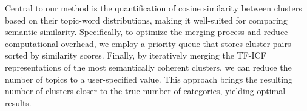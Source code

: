 Central to our method is the quantification of cosine similarity between clusters based on their topic-word distributions, making it well-suited for comparing semantic similarity. Specifically, to optimize the merging process and reduce computational overhead, we employ a priority queue that stores cluster pairs sorted by similarity scores. Finally, by iteratively merging the TF-ICF representations of the most semantically coherent clusters, we can reduce the number of topics to a user-specified value. This approach brings the resulting number of clusters closer to the true number of categories, yielding optimal results.

